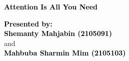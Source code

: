 \documentclass{beamer}
\begin{document}
\begin{frame}[plain]
    \begin{center}
        \Huge
        \textbf{\textcolor{black}{Attention Is All You Need}}
        
        \vspace{1cm}

        \LARGE
        \textbf{\textcolor{black}{Presented by:}} \\
        \vspace{0.4cm}
        \textbf{\textcolor{black}{Shemanty Mahjabin (2105091)}} \\ and \\ \textbf{\textcolor{black}{Mahbuba Sharmin Mim (2105103)}}

        \vspace{1cm}

    \end{center}
\end{frame}
\end{document}
